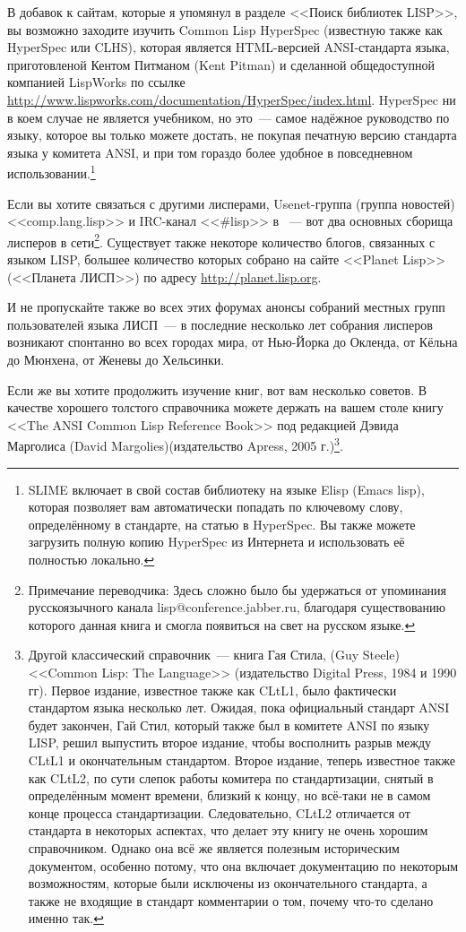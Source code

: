 В добавок к сайтам, которые я упомянул в разделе <<Поиск библиотек LISP>>, вы возможно
заходите изучить Common Lisp HyperSpec (известную также как HyperSpec или CLHS), которая
является HTML-версией ANSI-стандарта языка, приготовленой Кентом Питманом (Kent Pitman) и
сделанной общедоступной компанией LispWorks по ссылке
\url{http://www.lispworks.com/documentation/HyperSpec/index.html}. HyperSpec ни в коем
случае не является учебником, но это~--- самое надёжное руководство по языку, которое вы
только можете достать, не покупая печатную версию стандарта языка у комитета ANSI, и при
том гораздо более удобное в повседневном использовании.\footnote{SLIME включает в свой
  состав библиотеку на языке Elisp (Emacs lisp), которая позволяет вам автоматически
  попадать по ключевому слову, определённому в стандарте, на статью в HyperSpec. Вы также
  можете загрузить полную копию HyperSpec из Интернета и использовать её полностью
  локально.}

Если вы хотите связаться с другими лисперами, Usenet-группа (группа новостей)
<<comp.lang.lisp>> и IRC-канал <<\#lisp>> в ~--- вот два основных сборища лисперов в сети\footnote{Примечание переводчика:
  Здесь сложно было бы удержаться от упоминания русскоязычного канала
  lisp@conference.jabber.ru, благодаря существованию которого данная книга и смогла
  появиться на свет на русском языке.}. Существует также некоторе количество блогов,
связанных с языком LISP, большее количество которых собрано на сайте <<Planet Lisp>>
(<<Планета ЛИСП>>) по адресу \url{http://planet.lisp.org}.

И не пропускайте также во всех этих форумах анонсы собраний местных групп пользователей
языка ЛИСП~--- в последние несколько лет собрания лисперов возникают спонтанно во всех
городах мира, от Нью-Йорка до Окленда, от Кёльна до Мюнхена, от Женевы до Хельсинки.

Если же вы хотите продолжить изучение книг, вот вам несколько советов. В качестве хорошего
толстого справочника можете держать на вашем столе книгу <<The ANSI Common Lisp Reference
Book>> под редакцией Дэвида Марголиса (David Margolies)(издательство Apress, 2005
г.)\footnote{Другой классический справочник~--- книга Гая Стила, (Guy Steele) <<Common
    Lisp: The Language>> (издательство Digital Press, 1984 и 1990 гг). Первое издание,
    известное также как CLtL1, было фактически стандартом языка несколько лет. Ожидая,
    пока официальный стандарт ANSI будет закончен, Гай Стил, который также был в комитете
    ANSI по языку LISP, решил выпустить второе издание, чтобы восполнить разрыв между
    CLtL1 и окончательным стандартом. Второе издание, теперь известное также как CLtL2, по
    сути слепок работы комитера по стандартизации, снятый в определённым момент времени,
    близкий к концу, но всё-таки не в самом конце процесса стандартизации. Следовательно,
    CLtL2 отличается от стандарта в некоторых аспектах, что делает эту книгу не очень
    хорошим справочником. Однако она всё же является полезным историческим документом,
    особенно потому, что она включает документацию по некоторым возможностям, которые были
    исключены из окончательного стандарта, а также не входящие в стандарт комментарии о
    том, почему что-то сделано именно так.}.

